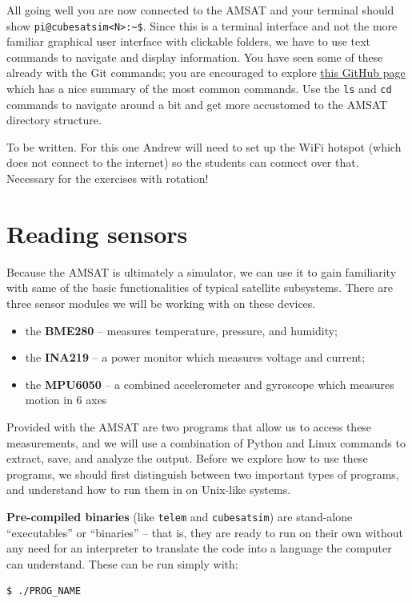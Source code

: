 \documentclass{tufte-book}
\begin{document}

All going well you are now connected to the AMSAT and your terminal should show \verb|pi@cubesatsim<N>:~$|. Since this is a terminal interface and not the more familiar graphical user interface with clickable folders, we have to use text commands to navigate and display information. You have seen some of these already with the Git commands; you are encouraged to explore \href{https://gist.github.com/bradtraversy/cc180de0edee05075a6139e42d5f28ce}{this GitHub page} which has a nice summary of the most common commands. Use the \verb|ls| and \verb|cd| commands to navigate around a bit and get more accustomed to the AMSAT directory structure.


To be written. For this one Andrew will need to set up the WiFi hotspot (which does not connect to the internet) so the students can connect over that. Necessary for the exercises with rotation!

\section{Reading sensors}

Because the AMSAT is ultimately a simulator, we can use it to gain familiarity with same of the basic functionalities of typical satellite subsystems. There are three sensor modules we will be working with on these devices.

\begin{itemize}
    \item the \textbf{BME280} -- measures temperature, pressure, and humidity;
    \item the \textbf{INA219} -- a power monitor which measures voltage and current;
    \item the \textbf{MPU6050} -- a combined accelerometer and gyroscope which measures motion in 6 axes
\end{itemize}

Provided with the AMSAT are two programs that allow us to access these measurements, and we will use a combination of Python and Linux commands to extract, save, and analyze the output.
Before we explore how to use these programs, we should first distinguish between two important types of programs, and understand how to run them in on Unix-like systems.

\textbf{Pre-compiled binaries} (like \verb|telem| and \verb|cubesatsim|) are stand-alone ``executables'' or ``binaries'' -- that is, they are ready to run on their own without any need for an interpreter to translate the code into a language the computer can understand. These can be run simply with:
\begin{lstlisting}[backgroundcolor=\color{lightgray}, language=Bash]
$ ./PROG_NAME
\end{lstlisting}
\end{document}
